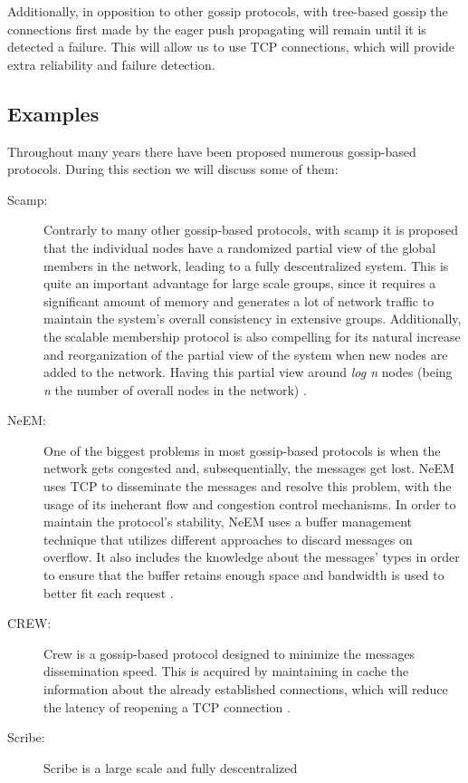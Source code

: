 Additionally, in opposition to other gossip protocols, with tree-based gossip the connections
first made by the eager push propagating will remain until it is detected a failure. This will
allow us to use TCP connections, which will provide extra reliability and failure detection.


\subsection{Examples}
\label{subsec:gossip_examples}
Throughout many years there have been proposed numerous gossip-based protocols. During this
section we will discuss some of them:
\begin{description}
    \item[\Gls{Scamp}:] Contrarly to many other gossip-based protocols, with scamp it is
        proposed that the individual nodes have a randomized partial view of the global
        members in the network, leading to a fully descentralized system. This is quite an
        important advantage for large scale groups, since it requires a significant amount
        of memory and generates a lot of network traffic to maintain the system's overall
        consistency in extensive groups. Additionally, the scalable membership protocol is
        also compelling for its natural increase and reorganization of the partial view of
        the system when new nodes are added to the network. Having this partial view around
        \textit{log n} nodes (being \textit{n} the number of overall nodes in the network)
        \cite{Ganesh2001}.
    \item[\Gls{NeEM}:] One of the biggest problems in most gossip-based protocols is when the
        network gets congested and, subsequentially, the messages get lost. NeEM uses \Gls{TCP}
        to disseminate the messages and resolve this problem, with the usage of its ineherant
        flow and congestion control mechanisms. In order to maintain the protocol's stability,
        NeEM uses a buffer management technique that utilizes different approaches to discard
        messages on overflow. It also includes the knowledge about the messages' types in order
        to ensure that the buffer retains enough space and bandwidth is used to better fit each
        request \cite{Pereira2003}.
    \item[\Gls{CREW}:] Crew is a gossip-based protocol designed to minimize the messages
        dissemination speed. This is acquired by maintaining in cache the information about
        the already established connections, which will reduce the latency of reopening a
        TCP connection \cite{Deshpande2006}.
    \item[Scribe:] Scribe is a large scale and fully descentralized
\end{description}


